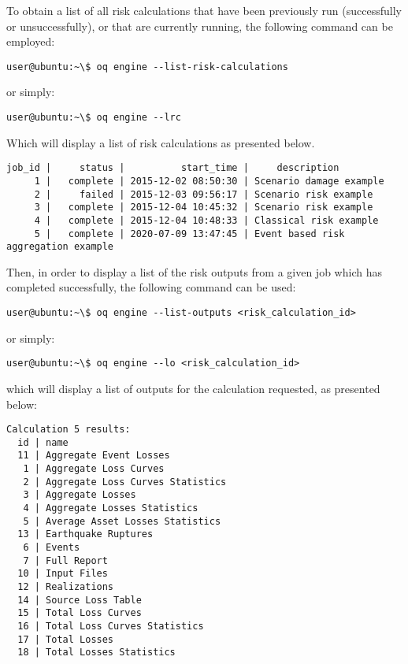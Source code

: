 To obtain a list of all risk calculations that have been previously run
(successfully or unsuccessfully), or that are currently running, the following
command can be employed:

\begin{verbatim}
user@ubuntu:~\$ oq engine --list-risk-calculations
\end{verbatim}

or simply:

\begin{verbatim}
user@ubuntu:~\$ oq engine --lrc
\end{verbatim}

Which will display a list of risk calculations as presented below.

\begin{verbatim}
job_id |     status |          start_time |     description
     1 |   complete | 2015-12-02 08:50:30 | Scenario damage example
     2 |     failed | 2015-12-03 09:56:17 | Scenario risk example
     3 |   complete | 2015-12-04 10:45:32 | Scenario risk example
     4 |   complete | 2015-12-04 10:48:33 | Classical risk example
     5 |   complete | 2020-07-09 13:47:45 | Event based risk aggregation example     
\end{verbatim}

Then, in order to display a list of the risk outputs from a given job which has
completed successfully, the following command can be used:

\begin{verbatim}
user@ubuntu:~\$ oq engine --list-outputs <risk_calculation_id>
\end{verbatim}

or simply:

\begin{verbatim}
user@ubuntu:~\$ oq engine --lo <risk_calculation_id>
\end{verbatim}

which will display a list of outputs for the calculation requested, as
presented below:

\begin{verbatim}
Calculation 5 results:
  id | name
  11 | Aggregate Event Losses
   1 | Aggregate Loss Curves
   2 | Aggregate Loss Curves Statistics
   3 | Aggregate Losses
   4 | Aggregate Losses Statistics
   5 | Average Asset Losses Statistics
  13 | Earthquake Ruptures
   6 | Events
   7 | Full Report
  10 | Input Files
  12 | Realizations
  14 | Source Loss Table
  15 | Total Loss Curves
  16 | Total Loss Curves Statistics
  17 | Total Losses
  18 | Total Losses Statistics
\end{verbatim}

